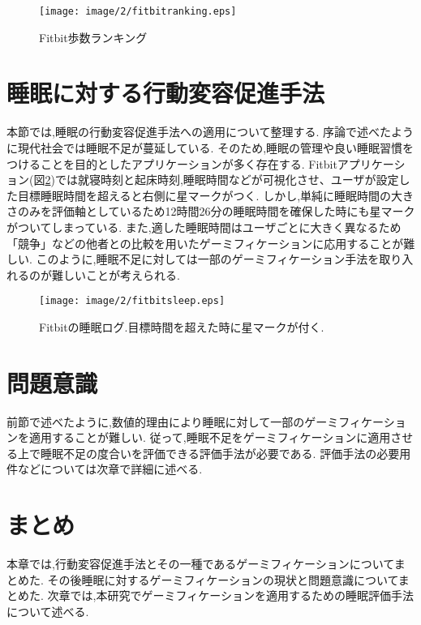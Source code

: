 \begin{figure}[tbp]
	\begin{center}
		\texttt{[image: image/2/fitbitranking.eps]}
		\caption{Fitbit歩数ランキング}
		\label{fitbitranking}
	\end{center}
\end{figure}

\section{睡眠に対する行動変容促進手法}
本節では,睡眠の行動変容促進手法への適用について整理する.
序論で述べたように現代社会では睡眠不足が蔓延している.
そのため,睡眠の管理や良い睡眠習慣をつけることを目的としたアプリケーションが多く存在する.
Fitbitアプリケーション(図\ref{fitbitsleep})では就寝時刻と起床時刻,睡眠時間などが可視化させ、ユーザが設定した目標睡眠時間を超えると右側に星マークがつく.
しかし,単純に睡眠時間の大きさのみを評価軸としているため12時間26分の睡眠時間を確保した時にも星マークがついてしまっている.
また,適した睡眠時間はユーザごとに大きく異なるため「競争」などの他者との比較を用いたゲーミフィケーションに応用することが難しい.
このように,睡眠不足に対しては一部のゲーミフィケーション手法を取り入れるのが難しいことが考えられる.

\begin{figure}[tbp]
	\begin{center}
		\texttt{[image: image/2/fitbitsleep.eps]}
		\caption{Fitbitの睡眠ログ.目標時間を超えた時に星マークが付く.}
		\label{fitbitsleep}
	\end{center}
\end{figure}

\section{問題意識}
前節で述べたように,数値的理由により睡眠に対して一部のゲーミフィケーションを適用することが難しい.
従って,睡眠不足をゲーミフィケーションに適用させる上で睡眠不足の度合いを評価できる評価手法が必要である.
評価手法の必要用件などについては次章で詳細に述べる.

\section{まとめ}
本章では,行動変容促進手法とその一種であるゲーミフィケーションについてまとめた.
その後睡眠に対するゲーミフィケーションの現状と問題意識についてまとめた.
次章では,本研究でゲーミフィケーションを適用するための睡眠評価手法について述べる.

